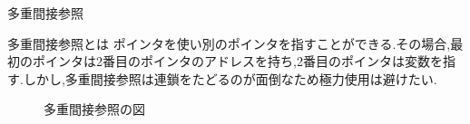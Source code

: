 \documentclass[xdvipdfmx, 8pt, t]{beamer}
\begin{document}
\begin{frame}[fragile]{多重間接参照}
    \begin{block}{多重間接参照とは}
        ポインタを使い別のポインタを指すことができる.その場合,最初のポインタは2番目のポインタのアドレスを持ち,2番目のポインタは変数を指す.しかし,多重間接参照は連鎖をたどるのが面倒なため極力使用は避けたい.
    \end{block}

    \begin{figure}[h]
        \centering
        
        \caption{多重間接参照の図}
        \label{fig:enter-label}
    \end{figure}
\end{frame}
\end{document}
